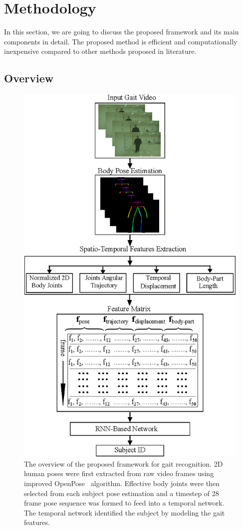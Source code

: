 \chapter{Methodology}\label{methodology}
In this section, we are going to discuss the proposed framework and its main components in detail. The proposed method is efficient and computationally inexpensive compared to other methods proposed in literature.

\section{Overview}
\begin{figure}
	\centering
	\includegraphics[width=115mm]{figures/proposed_method.eps}
	\caption{
The overview of the proposed framework for gait recognition. 2D human poses were first extracted from raw video frames using improved OpenPose~\cite{Cao_19} algorithm. Effective body joints were then selected from each subject pose estimation and a timestep of 28 frame pose sequence was formed to feed into a temporal network. The temporal network identified the subject by modeling the gait features.
	}
	\label{fig:proposed_method}
\end{figure}


